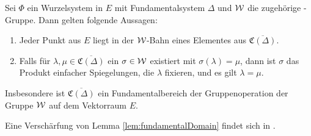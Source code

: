 \begin{lem}
  \label{lem:fundamentalDomain}
  Sei $\Phi$ ein Wurzelsystem in $E$ mit Fundamentalsystem $\Delta$ und $\mathcal{W}$ die zugehörige \weyl\hyp{}Gruppe.
  Dann gelten folgende Aussagen:
  \begin{enumerate}[(1)]
    \item Jeder Punkt aus $E$ liegt in der $\mathcal{W}$\hyp{}Bahn eines Elementes aus  $\overline{\mathfrak{C}(\Delta)}$.
    \item Falls für $\lambda, \mu \in \overline{\mathfrak{C}(\Delta)}$ ein $\sigma \in \mathcal{W}$ existiert mit $\sigma (\lambda) = \mu$, dann ist $\sigma$ das Produkt einfacher Spiegelungen, die $\lambda$ fixieren, und es gilt $\lambda = \mu$.
  \end{enumerate}
  Insbesondere ist $\overline{\mathfrak{C}(\Delta)}$ ein Fundamentalbereich der Gruppenoperation der Gruppe $\mathcal{W}$ auf dem Vektorraum $E$.
\end{lem}

Eine Verschärfung von Lemma \ref{lem:fundamentalDomain} findet sich in \cite[S.22]{humphreys1992reflection}.

